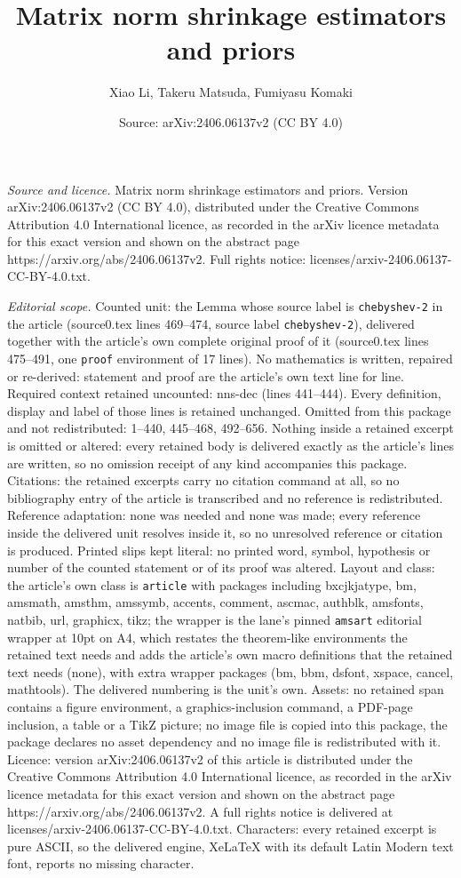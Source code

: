 \documentclass[10pt,a4paper]{amsart}
\title[Matrix norm shrinkage estimators and priors]{Matrix norm shrinkage estimators and priors}
\author{Xiao Li, Takeru Matsuda, Fumiyasu Komaki}
\date{Source: arXiv:2406.06137v2 (CC BY 4.0)}
\begin{document}
\maketitle

\noindent\emph{Source and licence.} Matrix norm shrinkage estimators and priors. Version arXiv:2406.06137v2 (CC BY 4.0), distributed under the Creative Commons Attribution 4.0 International licence, as recorded in the arXiv licence metadata for this exact version and shown on the abstract page https://arxiv.org/abs/2406.06137v2. Full rights notice: licenses/arxiv-2406.06137-CC-BY-4.0.txt.\par\smallskip

\noindent\textit{Editorial scope.} Counted unit: the Lemma whose source label is \texttt{chebyshev-2} in the article (source0.tex lines 469--474, source label \texttt{chebyshev-2}), delivered together with the article's own complete original proof of it (source0.tex lines 475--491, one \texttt{proof} environment of 17 lines). No mathematics is written, repaired or re-derived: statement and proof are the article's own text line for line. Required context retained uncounted: nns-dec (lines 441--444). Every definition, display and label of those lines is retained unchanged. Omitted from this package and not redistributed: 1--440, 445--468, 492--656. Nothing inside a retained excerpt is omitted or altered: every retained body is delivered exactly as the article's lines are written, so no omission receipt of any kind accompanies this package. Citations: the retained excerpts carry no citation command at all, so no bibliography entry of the article is transcribed and no reference is redistributed. Reference adaptation: none was needed and none was made; every reference inside the delivered unit resolves inside it, so no unresolved reference or citation is produced. Printed slips kept literal: no printed word, symbol, hypothesis or number of the counted statement or of its proof was altered. Layout and class: the article's own class is \texttt{article} with packages including bxcjkjatype, bm, amsmath, amsthm, amssymb, accents, comment, ascmac, authblk, amsfonts, natbib, url, graphicx, tikz; the wrapper is the lane's pinned \texttt{amsart} editorial wrapper at 10pt on A4, which restates the theorem-like environments the retained text needs and adds the article's own macro definitions that the retained text needs (none), with extra wrapper packages (bm, bbm, dsfont, xspace, cancel, mathtools). The delivered numbering is the unit's own. Assets: no retained span contains a figure environment, a graphics-inclusion command, a PDF-page inclusion, a table or a TikZ picture; no image file is copied into this package, the package declares no asset dependency and no image file is redistributed with it. Licence: version arXiv:2406.06137v2 of this article is distributed under the Creative Commons Attribution 4.0 International licence, as recorded in the arXiv licence metadata for this exact version and shown on the abstract page https://arxiv.org/abs/2406.06137v2. A full rights notice is delivered at licenses/arxiv-2406.06137-CC-BY-4.0.txt. Characters: every retained excerpt is pure ASCII, so the delivered engine, XeLaTeX with its default Latin Modern text font, reports no missing character.
\end{document}
